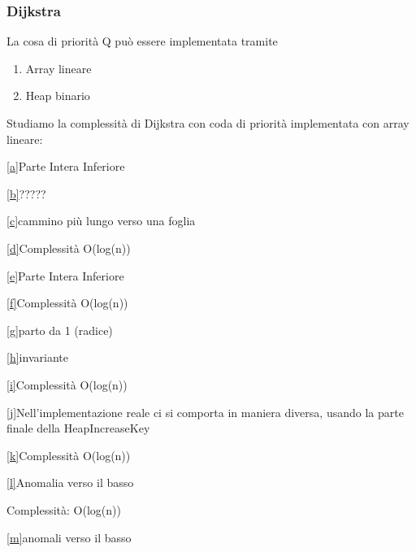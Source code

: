 \documentclass{article}
\providecommand{\tightlist}{%
  \setlength{\itemsep}{0pt}\setlength{\parskip}{0pt}}
\begin{document}


\subsubsection{\texorpdfstring{{Dijkstra}}{Dijkstra}}\label{h.d7e75pwi333b}

\protect\hypertarget{t.d055ffe7c1698902badd9b7488033a931b1cfb1d}{}{}\protect\hypertarget{t.48}{}{}




{La cosa di priorità Q può essere implementata tramite}

\begin{enumerate}
\tightlist
\item
  {Array lineare}
\item
  {Heap binario}
\end{enumerate}

{Studiamo la complessità di Dijkstra con coda di priorità implementata
con array lineare:}

\protect\hyperlink{cmnt_ref1}{{[}a{]}}{Parte Intera Inferiore}

\protect\hyperlink{cmnt_ref2}{{[}b{]}}{?????}

\protect\hyperlink{cmnt_ref3}{{[}c{]}}{cammino più lungo verso una
foglia}

\protect\hyperlink{cmnt_ref4}{{[}d{]}}{Complessità O(log(n))}

\protect\hyperlink{cmnt_ref5}{{[}e{]}}{Parte Intera Inferiore}

\protect\hyperlink{cmnt_ref6}{{[}f{]}}{Complessità O(log(n))}

\protect\hyperlink{cmnt_ref7}{{[}g{]}}{parto da 1 (radice)}

\protect\hyperlink{cmnt_ref8}{{[}h{]}}{invariante}

\protect\hyperlink{cmnt_ref9}{{[}i{]}}{Complessità O(log(n))}

\protect\hyperlink{cmnt_ref10}{{[}j{]}}{Nell'implementazione reale ci si
comporta in maniera diversa, usando la parte finale della
HeapIncreaseKey}

\protect\hyperlink{cmnt_ref11}{{[}k{]}}{Complessità O(log(n))}

\protect\hyperlink{cmnt_ref12}{{[}l{]}}{Anomalia verso il basso}

{Complessità: O(log(n))}

\protect\hyperlink{cmnt_ref13}{{[}m{]}}{anomali verso il basso}
\end{document}
